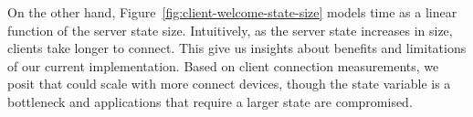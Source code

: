 On the other hand, Figure~\ref{fig:client-welcome-state-size} models time as a linear function of the server state size.
Intuitively, as the server state increases in size, clients take longer to connect. 
This give us insights about benefits and limitations of our current implementation.
Based on client connection measurements, we posit that \APIshort could scale with more connect devices, though the state variable is a bottleneck and applications that require a larger state are compromised.